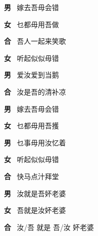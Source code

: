 \documentclass{ctexart}
\begin{document}
\begin{center}
\textbf{男} \ 嫁去吾毋会错

\textbf{女} \ 乜都毋用吾做

\textbf{合} \ 吾人一起来笑歌

\textbf{女} \ 听起似似毋错

\textbf{男} \ 爱汝爱到当鹅

\textbf{合} \ 汝是吾的清补凉

\textbf{男} \ 嫁去吾毋会错

\textbf{女} \ 乜都毋用吾擭

\textbf{男} \ 乜事毋用汝忆着

\textbf{女} \ 听起似似毋错

\textbf{合} \ 快马点汁拜堂

\textbf{男} \ 汝就是吾妚老婆

\textbf{女} \ 吾就是汝妚老婆

\textbf{合} \ 汝/吾 就是 吾/汝 妚老婆

\end{center}
\end{document}
